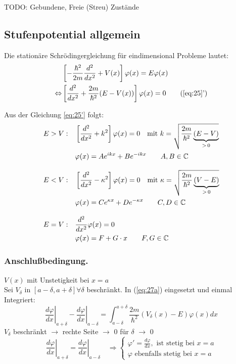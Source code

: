 TODO: Gebundene, Freie (Streu) Zustände

\subsection{Stufenpotential allgemein}

Die stationäre Schrödingergleichung für eindimensional Probleme lautet:
\begin{align} 
  &\left[-\frac{\hbar^2}{2m}\frac{d^2}{dx^2}+V(x)\right]\varphi(x)
  =E\varphi(x)\label{eq:25}\\
  \Leftrightarrow &\left[\frac{d^2}{dx^2} 
    +\frac{2m}{\hbar^2}(E-V(x))\right]\varphi(x)=0 
  \tag{\ref{eq:25}'}\label{eq:25'} 
\end{align}

Aus der Gleichung \eqref{eq:25'} folgt:
\begin{subequations}
  \label{eq:27}
  \begin{align}
    E>V: \quad &\left[\frac{d^2}{dx^2}+k^2\right]\varphi(x)=0 
    \quad \textrm{mit } k=\sqrt{\frac{2m}{\hbar^2}\underbrace{(E-V)}_{>\,0}} \notag \\
    &\varphi(x)=Ae^{ikx}+Be^{-ikx}  
    \qquad  A,B \in \mathbb{C} \label{eq:27a} \\[2ex]
    E<V: \quad &\left[\frac{d^2}{dx^2}-\kappa^2\right]\varphi(x)=0
    \quad  \textrm{mit } \kappa=\sqrt{\frac{2m}{\hbar^2}\underbrace{(V-E)}_{>\,0}} \notag \\
    &\varphi(x)=Ce^{\kappa x}+De^{-\kappa x}  
    \qquad  C,D \in \mathbb{C} \label{eq:27b}\\[2ex]
    E=V: \quad &\frac{d^2}{dx^2}\varphi(x)=0 \notag \\
    &\varphi(x)=F+G\cdot x   
    \qquad  F,G \in \mathbb{C} \label{eq:27c}
  \end{align}
\end{subequations}

\subsubsection{Anschlußbedingung.}
$V(x)$ mit Unstetigkeit bei $x=a$\\
Sei $V_\delta$ in $[a-\delta, a+\delta] \forall \delta$ beschränkt. In
(\ref{eq:27a}) eingesetzt und einmal Integriert:
\begin{equation*}
  \left. \frac{d\varphi}{dx}\right|_{a+\delta}-\left. \frac{d\varphi}{dx}\right|_{a-\delta} =
\int_{a-\delta}^{a+\delta} \frac{2m}{\hbar^2}
\left(V_\delta(x)-E\right)\varphi(x)dx
\end{equation*}
$V_\delta$ beschränkt $\rightarrow$ rechte Seite $\rightarrow$ 0 für $\delta$
$\rightarrow$ 0
\begin{equation*}
  \left. \frac{d\varphi}{dx}\right|_{a+\delta} = \left.
    \frac{d\varphi}{dx}\right|_{a-\delta} \quad
  \Rightarrow
 \begin{cases} 
   \varphi'=\frac{d\varphi}{dx}, \mbox{ ist stetig bei } x=a  \\
   \varphi \mbox{ ebenfalls stetig bei } x=a 
 \end{cases}
\end{equation*}


